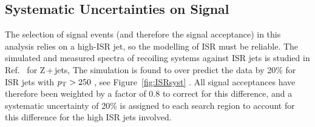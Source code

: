 \subsection{Systematic Uncertainties on Signal}
\label{sec:signalSYST}


The selection of signal events (and therefore the signal acceptance) in this analysis relies on a high-\pt ISR jet, so the modelling of ISR must be reliable.
The \MADGRAPH{} simulated and measured \pt spectra of recoiling systems against ISR jets is studied in Ref.~\cite{CMSsinglelep} for Z\,+\,jets, 
\ttbar {}
The simulation is found to over predict the data by 20\% for ISR jets with $p_{\text{T}} > 250$ \GeV, see Figure~\ref{fig:ISRsyst} 
.
All signal acceptances have therefore been weighted by a factor of 0.8 to correct for this difference, and a systematic uncertainty of 20\% is assigned to each search region to account for this difference for the high \pt ISR jets involved.

